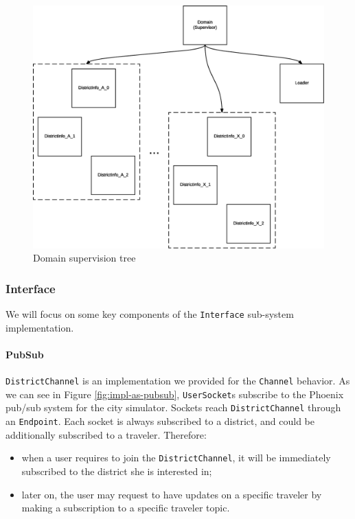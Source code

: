 \begin{figure}[H]
  \centering
  \includegraphics[width=.95\columnwidth]{images/implementation/as-domain.eps}
  \caption{Domain supervision tree}
  \label{fig:impl-as-domain}
\end{figure}

\subsubsection{Interface}

We will focus on some key components of the \texttt{Interface} sub-system
implementation.

\paragraph{PubSub}
\texttt{DistrictChannel} is an
implementation we provided for the \texttt{Channel} behavior. As we can see
in Figure \ref{fig:impl-as-pubsub}, \texttt{UserSocket}s subscribe to the
Phoenix pub/sub system for the city simulator.
Sockets reach \texttt{DistrictChannel} through an \texttt{Endpoint}.
Each socket is always subscribed to a district, and could be additionally
subscribed to a traveler. Therefore:

\begin{itemize}
  \item when a user requires to join the \texttt{DistrictChannel}, it will
    be immediately subscribed to the district she is interested in;
  \item later on, the user may request to have updates on a specific traveler
    by making a subscription to a specific traveler topic.
\end{itemize}

